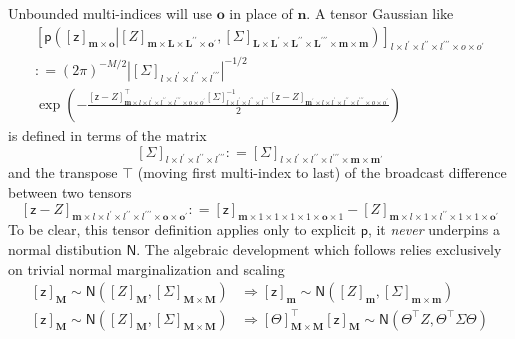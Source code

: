 \documentclass[preprint,12pt]{elsarticle}
\newcommand*{\M}[1]{\ensuremath{#1}\xspace}
\newcommand*{\x}{\times}
\newcommand*{\mi}[1]{\mathbf{#1}}
\newcommand*{\rv}[1]{\mathsf{#1}}
\newcommand*{\te}[2][]{\left\lbrack{#2}\right\rbrack_{#1}}
\newcommand*{\prob}[3]{\M{\mathsf{p}\!\left(\left.{#1}\right\vert{#2,#3}\right)}}
\newcommand*{\deq}{\M{\mathrel{\mathop:}=}}
\newcommand*{\gauss}[2]{\mathsf{N}\!\left({#1,#2}\right)}
\newcommand*{\modulus}[1]{\M{\left\lvert{#1}\right\rvert}}
\begin{document}
    Unbounded multi-indices will use $\mi{o}$ in place of $\mi{n}$.
    A tensor Gaussian like
    \begin{multline} \label{def:Notation:p}
        \te[l\x l^{\prime} \x l^{\prime\prime} \x l^{\prime\prime\prime} \x o\x o^{\prime}]{\prob{\te[\mi{m}\x\mi{o}]{\rv{z}}}{\te[\mi{m}\x\mi{L}\x\mi{L^{\prime\prime}}\x\mi{o^{\prime}}]{Z}}{\te[\mi{L}\x\mi{L^{\prime}}\x\mi{L^{\prime\prime}}\x\mi{L^{\prime\prime\prime}}\x\mi{m}\x\mi{m}]{\Sigma}}} \\
        \deq (2 \pi)^{-M/2} \modulus{\te[l\x l^{\prime} \x l^{\prime\prime} \x l^{\prime\prime\prime}]{\Sigma}}^{-1/2} \\
        \exp\left(-\frac{
            \te[\mi{m}\x l\x l^{\prime} \x l^{\prime\prime} \x l^{\prime\prime\prime} \x o\x o^{\prime}]{\rv{z}-Z}^{\intercal} 
        \te[l\x l^{\prime} \x l^{\prime\prime} \x l^{\prime\prime\prime}]{\Sigma}^{-1} 
        \te[\mi{m^{\prime}}\x l\x l^{\prime} \x l^{\prime\prime} \x l^{\prime\prime\prime} \x o\x o^{\prime}]{\rv{z}-Z}}
        {2}\right)
    \end{multline}
    is defined in terms of the matrix
    \begin{equation*}
        \te[l\x l^{\prime} \x l^{\prime\prime} \x l^{\prime\prime\prime}]{\Sigma} \deq
        \te[l\x l^{\prime} \x l^{\prime\prime} \x l^{\prime\prime\prime}\x\mi{m}\x\mi{m^{\prime}}]{\Sigma}
    \end{equation*}
    and the transpose ${\intercal}$ (moving first multi-index to last) of the broadcast difference between two tensors
    \begin{equation*}
        \te[\mi{m}\x l\x l^{\prime} \x l^{\prime\prime} \x l^{\prime\prime\prime} \x \mi{o}\x \mi{o^{\prime}}]{\rv{z} - Z}
        \deq \te[\mi{m}\x 1\x 1\x 1\x 1\x\mi{o}\x 1]{\rv{z}} - \te[\mi{m}\x l\x 1\x l^{\prime\prime}\x 1\x 1\x\mi{o^{\prime}}]{Z}
    \end{equation*}
    To be clear, this tensor definition applies only to explicit $\mathsf{p}$, it \emph{never} underpins a normal distibution $\mathsf{N}$. 
    The algebraic development which follows relies exclusively on trivial normal marginalization and scaling
    \begin{equation} \label{eq:Notation:marginalization}
        \begin{aligned}
            \te[\mi{M}]{\rv{z}} \sim \gauss{\te[\mi{M}]{Z}}{\te[\mi{M}\x\mi{M}]{\Sigma}} &\Rightarrow
            \te[\mi{m}]{\rv{z}} \sim \gauss{\te[\mi{m}]{Z}}{\te[\mi{m}\x\mi{m}]{\Sigma}} \\
            \te[\mi{M}]{\rv{z}} \sim \gauss{\te[\mi{M}]{Z}}{\te[\mi{M}\x\mi{M}]{\Sigma}} &\Rightarrow
            \te[\mi{M}\x\mi{M}]{\Theta}^{\intercal}\te[\mi{M}]{\rv{z}} \sim \gauss{\Theta^{\intercal}Z}{\Theta^{\intercal}\Sigma\Theta}                        
        \end{aligned}
    \end{equation}
\end{document}
